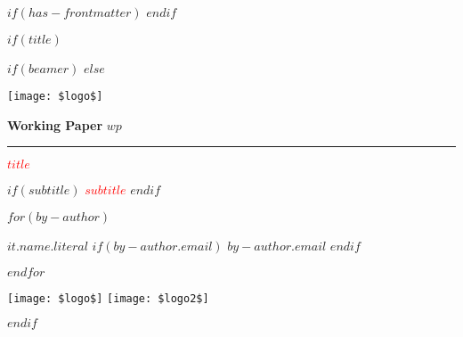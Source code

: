 $if(has-frontmatter)$
\frontmatter
$endif$

$if(title)$

$if(beamer)$
\frame{\titlepage}
$else$

\begin{titlepage}
\raisebox{9.5cm}
{
   \begin{minipage}{0.22\linewidth}
   
   \texttt{[image: \$logo\$]}
   
   \textbf{Working Paper} $wp$
\end{minipage} 
} 
%
%
\begin{minipage}{0.02\linewidth}
    \rule{1pt}{\textheight}
\end{minipage} 
%
%
%
\begin{minipage}{0.7\linewidth}
 \textcolor{red}{\Huge\textbf{\textsf{$title$}}}
 
 $if(subtitle)$
\vspace{5mm}
 \textcolor{red}{\textbf{\textsf{$subtitle$}}}
\vspace{5mm}
 $endif$
 \vspace{20mm}
 
 $for(by-author)$ 

  \textbf{$it.name.literal$}
  $if(by-author.email)$
  \newline \indent \textit{$by-author.email$}
  $endif$

$endfor$ %


  \texttt{[image: \$logo\$]} \hspace{2cm}  \texttt{[image: \$logo2\$]}
\end{minipage}
%
%

\end{titlepage}
$endif$
%
%